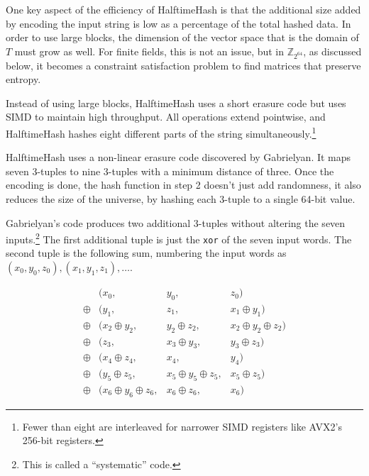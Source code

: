 \documentclass[sigconf, nonacm]{acmart}
\newcommand{\ints}{\mathbb{Z}}
\begin{document}
One key aspect of the efficiency of HalftimeHash is that the additional size added by encoding the input string is low as a percentage of the total hashed data.
In order to use large blocks, the dimension of the vector space that is the domain of $T$ must grow as well.
For finite fields, this is not an issue, but in $\ints_{2^{64}}$, as discussed below, it becomes a constraint satisfaction problem to find matrices that preserve entropy.

Instead of using large blocks, HalftimeHash uses a short erasure code but uses SIMD to maintain high throughput.
All operations extend pointwise, and HalftimeHash hashes eight different parts of the string simultaneously.\footnote{Fewer than eight are interleaved for narrower SIMD registers like AVX2's 256-bit registers.}

HalftimeHash uses a non-linear erasure code discovered by Gab\-ri\-el\-yan. \cite{9-7-erasure-code}
It maps seven 3-tuples to nine 3-tuples with a minimum distance of three.
Once the encoding is done, the hash function in step 2 doesn't just add randomness, it also reduces the size of the universe, by hashing each 3-tuple to a single 64-bit value.

Gabrielyan's code produces two additional 3-tuples without altering the seven inputs.\footnote{This is called a ``systematic'' code.}
The first additional tuple is just the \texttt{xor} of the seven input words.
The second tuple is the following sum, numbering the input words as $(x_0, y_0, z_0), (x_1, y_1, z_1), \dots$.

\begin{displaymath}
  \begin{array}{rlcr}
       & (x_0, & y_0, & z_0)\\
\oplus & (y_1,  & z_1,  & x_1 \oplus{} y_1) \\
\oplus & (x_2 \oplus{} y_2,& y_2 \oplus{} z_2,& x_2 \oplus{} y_2 \oplus{} z_2)\\
\oplus & (z_3,    &x_3 \oplus{} y_3,& y_3 \oplus{} z_3) \\
\oplus & (x_4 \oplus{} z_4,& x_4,& y_4)\\
\oplus & (y_5 \oplus{} z_5,& x_5 \oplus{} y_5 \oplus{} z_5,& x_5\oplus{}z_5)\\
\oplus & (x_6 \oplus{} y_6 \oplus{} z_6,& x_6 \oplus{} z_6,& x_6)
  \end{array}
\end{displaymath}
\end{document}
